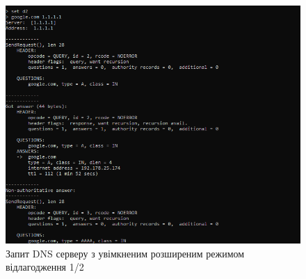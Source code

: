 \documentclass{article}
\begin{document}
\begin{normalsize}
\begin{figure}[H]
	\centering
	\includegraphics[width=\textwidth]{34}
	\caption{Запит DNS серверу з увімкненим розширеним режимом відлагодження 1/2}
\end{figure}


\end{normalsize}
\end{document}

